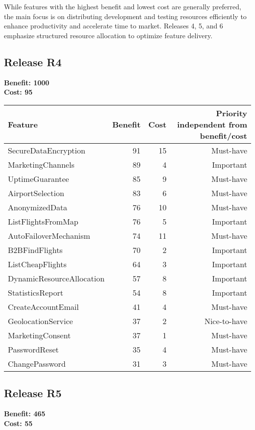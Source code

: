 While features with the highest benefit and lowest cost are generally preferred, the main focus is on distributing development and testing resources efficiently to enhance productivity and accelerate time to market. Releases 4, 5, and 6 emphasize structured resource allocation to optimize feature delivery.


\subsection{Release R4}
\textbf{Benefit: 1000} \\
\textbf{Cost: 95} \\

\begin{tabular}{lrrr}
\toprule
\textbf{Feature} & \textbf{Benefit} & \textbf{Cost} & \textbf{Priority} independent from benefit/cost \\
\midrule
SecureDataEncryption & 91 & 15 & Must-have \\
MarketingChannels & 89 & 4 & Important \\
UptimeGuarantee & 85 & 9 & Must-have \\
AirportSelection & 83 & 6 & Must-have \\
AnonymizedData & 76 & 10 & Must-have \\
ListFlightsFromMap & 76 & 5 & Important \\
AutoFailoverMechanism & 74 & 11 & Must-have \\
B2BFindFlights & 70 & 2 & Important \\
ListCheapFlights & 64 & 3 & Important \\
DynamicResourceAllocation & 57 & 8 & Important \\
StatisticsReport & 54 & 8 & Important \\
CreateAccountEmail & 41 & 4 & Must-have \\
GeolocationService & 37 & 2 & Nice-to-have \\
MarketingConsent & 37 & 1 & Must-have \\
PasswordReset & 35 & 4 & Must-have \\
ChangePassword & 31 & 3 & Must-have \\
\bottomrule 
\end{tabular}

\subsection{Release R5}
\textbf{Benefit: 465} \\
\textbf{Cost: 55} \\

